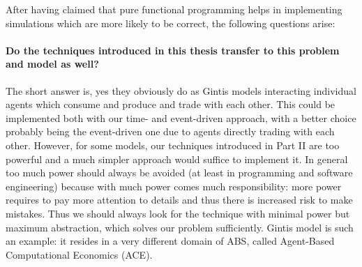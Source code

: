 After having claimed that pure functional programming helps in implementing simulations which are more likely to be correct, the following questions arise:

\paragraph{Do the techniques introduced in this thesis transfer to this problem and model as well?}
The short answer is, yes they obviously do as Gintis models interacting individual agents which consume and produce and trade with each other. This could be implemented both with our time- and event-driven approach, with a better choice probably being the event-driven one due to agents directly trading with each other. However, for some models, our techniques introduced in Part II are too powerful and a much simpler approach would suffice to implement it. In general too much power should always be avoided (at least in programming and software engineering) because with much power comes much responsibility: more power requires to pay more attention to details and thus there is increased risk to make mistakes. Thus we should always look for the technique with minimal power but maximum abstraction, which solves our problem sufficiently. Gintis model is such an example: it resides in a very different domain of ABS, called Agent-Based Computational Economics (ACE).

